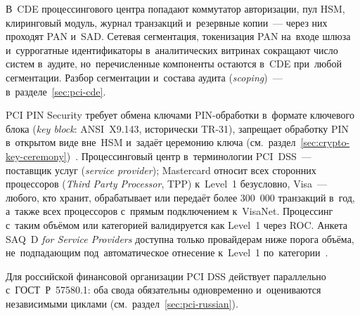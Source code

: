В~CDE процессингового центра попадают коммутатор авторизации, пул HSM,
клиринговый модуль, журнал транзакций и~резервные копии~--- через них проходят
PAN и~SAD. Сетевая сегментация, токенизация PAN на~входе шлюза
и~суррогатные идентификаторы в~аналитических витринах сокращают число систем
в~аудите, но~перечисленные компоненты остаются в~CDE при~любой сегментации.
Разбор сегментации и~состава аудита (\textit{scoping})~--- в~разделе~\ref{sec:pci-cde}.

PCI PIN Security требует обмена ключами PIN-обработки в~формате ключевого блока
(\textit{key block}: ANSI~X9.143, исторически TR-31), запрещает обработку PIN
в~открытом виде вне~HSM и~задаёт церемонию ключа
(см.~раздел~\ref{sec:crypto-key-ceremony})~\cite{pci-pin-security}.
Процессинговый центр в~терминологии PCI~DSS~--- поставщик услуг
(\textit{service provider}); Mastercard относит всех сторонних процессоров
(\textit{Third Party Processor}, TPP) к~Level~1 безусловно, Visa~--- любого,
кто хранит, обрабатывает или передаёт более 300~000 транзакций в~год, а~также
всех процессоров с~прямым подключением к~VisaNet. Процессинг с~таким объёмом
или категорией валидируется как Level~1 через ROC. Анкета SAQ~D
\textit{for Service Providers} доступна только провайдерам ниже порога объёма,
не~подпадающим под~автоматическое отнесение к~Level~1
по~категории~\cite{mc-service-provider-categories-pci,visa-pci-validation-best-practice,visa-merchant-levels,pci-saq}.

Для российской финансовой организации PCI DSS действует параллельно
с~ГОСТ~Р~57580.1: оба свода обязательны одновременно и~оцениваются независимыми
циклами (см.~раздел~\ref{sec:pci-russian}).
